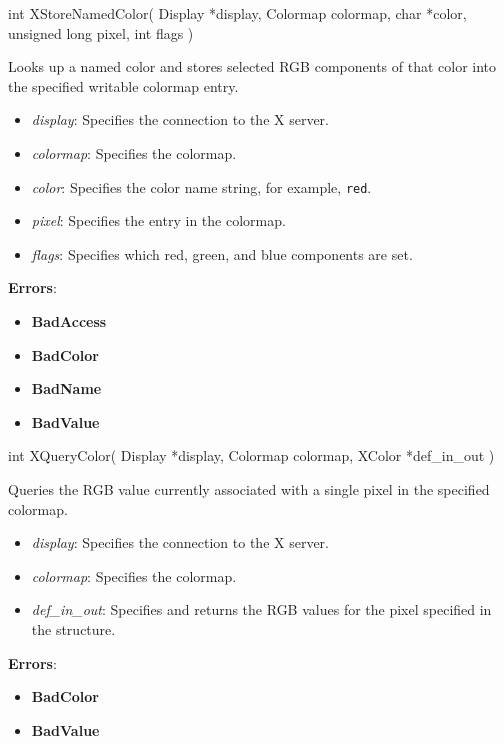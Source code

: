 \documentclass{report}
\begin{document}
\begin{itemize}
            \begin{cppcode}
                int XStoreNamedColor(
                    Display *display,
                    Colormap colormap,
                    char *color,
                    unsigned long pixel,
                    int flags
                )
            \end{cppcode}
            \bigbreak \noindent
            Looks up a named color and stores selected RGB components of that color into the specified writable colormap entry.
            \begin{itemize}
                \item \textit{display}: Specifies the connection to the X server.
                \item \textit{colormap}: Specifies the colormap.
                \item \textit{color}: Specifies the color name string, for example, \texttt{red}.
                \item \textit{pixel}: Specifies the entry in the colormap.
                \item \textit{flags}: Specifies which red, green, and blue components are set.
            \end{itemize}
            \bigbreak \noindent
            \textbf{Errors}:
            \begin{itemize}
                \item \textbf{BadAccess}
                \item \textbf{BadColor}
                \item \textbf{BadName}
                \item \textbf{BadValue}
            \end{itemize}

            \begin{cppcode}
                int XQueryColor(
                    Display *display,
                    Colormap colormap,
                    XColor *def_in_out
                )
            \end{cppcode}
            \bigbreak \noindent
            Queries the RGB value currently associated with a single pixel in the specified colormap.
            \begin{itemize}
                \item \textit{display}: Specifies the connection to the X server.
                \item \textit{colormap}: Specifies the colormap.
                \item \textit{def\_in\_out}: Specifies and returns the RGB values for the pixel specified in the structure.
            \end{itemize}
            \bigbreak \noindent
            \textbf{Errors}:
            \begin{itemize}
                \item \textbf{BadColor}
                \item \textbf{BadValue}
            \end{itemize}


\end{itemize}
\end{document}
